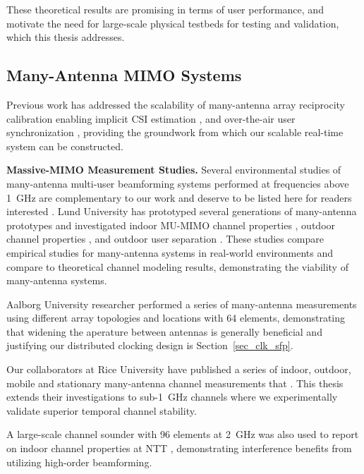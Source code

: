 	These theoretical results are promising in terms of user performance, and motivate the need for large-scale physical testbeds for testing and validation, which this thesis addresses.

\subsection{Many-Antenna MIMO Systems}
\label{sec_related_mami}

	Previous work has addressed the scalability of many-antenna array reciprocity calibration enabling implicit \ac{CSI} estimation \cite{shepard2012argos, rogalin2014scalable}, and over-the-air user synchronization \cite{shepard2015faros}, providing the groundwork from which our scalable real-time system can be constructed.

\textbf{Massive-MIMO Measurement Studies.}
	Several environmental studies of many-antenna multi-user beamforming systems performed at frequencies above 1~GHz are complementary to our work and deserve to be listed here for readers interested .
	Lund University has prototyped several generations of many-antenna prototypes and investigated indoor \ac{MU-MIMO} channel properties \cite{kolmonen2010measurement}, outdoor channel properties \cite{gao2011linear, payami2012channel, molisch2014propagation, gao2015massive}, and outdoor user separation \cite{flordelis2015spatial}.
	These studies compare empirical studies for many-antenna systems in real-world environments and compare to theoretical channel modeling results, demonstrating the viability of many-antenna systems.

Aalborg University researcher performed a series of many-antenna measurements using different array topologies and locations with 64 elements, demonstrating that widening the aperature between antennas is generally beneficial \cite{martinez2014towards} and justifying our distributed clocking design is Section~\ref{sec_clk_sfp}.

Our collaborators at Rice University have published a series of indoor, outdoor, mobile and stationary many-antenna channel measurements that \cite{shepard2012argos, shepard2013practical, shepard2013argosv2, shepard2015faros, everett2015measurement}.
	This thesis extends their investigations to sub-1~GHz channels where we experimentally validate superior temporal channel stability.
	
	A large-scale channel sounder with 96 elements at 2~GHz was also used to report on indoor channel properties at NTT \cite{kataoka2014performance}, demonstrating interference benefits from utilizing high-order beamforming.
	
